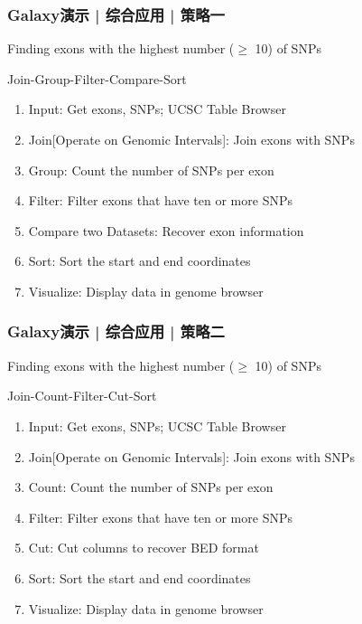 \begin{frame}
  \frametitle{Galaxy演示 | \alert{综合应用} | 策略一}
  \begin{block}{Finding exons with the highest number ($\geq$ 10) of SNPs}
    \pause
    \begin{block}{Join-Group-Filter-Compare-Sort}
    \pause
  \begin{enumerate}[<+-|alert@+>]
    \item Input: Get exons, SNPs; UCSC Table Browser
    \item Join[Operate on Genomic Intervals]: Join exons with SNPs
    \item Group: Count the number of SNPs per exon 
    \item Filter: Filter exons that have ten or more SNPs
    \item Compare two Datasets: Recover exon information
    \item Sort: Sort the start and end coordinates
    \item Visualize: Display data in genome browser
  \end{enumerate}
\end{block}
  \end{block}
\end{frame}

\begin{frame}
  \frametitle{Galaxy演示 | \alert{综合应用} | 策略二}
  \begin{block}{Finding exons with the highest number ($\geq$ 10) of SNPs}
    \pause
    \begin{block}{Join-Count-Filter-Cut-Sort}
    \pause
  \begin{enumerate}[<+-|alert@+>]
    \item Input: Get exons, SNPs; UCSC Table Browser
    \item Join[Operate on Genomic Intervals]: Join exons with SNPs
    \item Count: Count the number of SNPs per exon 
    \item Filter: Filter exons that have ten or more SNPs
    \item Cut: Cut columns to recover BED format
    \item Sort: Sort the start and end coordinates
    \item Visualize: Display data in genome browser
  \end{enumerate}
\end{block}
  \end{block}
\end{frame}

